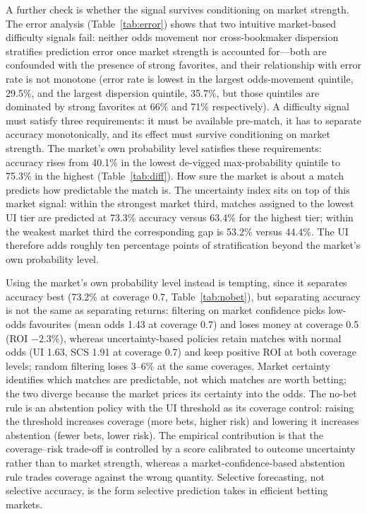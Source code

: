\documentclass[10pt]{article}
\begin{document}
A further check is whether the signal survives conditioning on market strength. The error analysis (Table~\ref{tab:error}) shows that two intuitive
market-based difficulty signals fail: neither odds movement nor cross-bookmaker
dispersion stratifies prediction error once market strength is accounted
for---both are confounded with the presence of strong favorites, and their
relationship with error rate is not monotone (error rate is lowest in the
largest odds-movement quintile, 29.5\%, and the largest dispersion quintile,
35.7\%, but those quintiles are dominated by strong favorites at 66\% and 71\%
respectively). A difficulty signal must satisfy three requirements: it must be
available pre-match, it has to separate accuracy monotonically, and its effect
must survive conditioning on market strength. The market's own probability
level satisfies these requirements: accuracy rises from 40.1\% in the lowest
de-vigged max-probability quintile to 75.3\% in the highest
(Table~\ref{tab:diff}). How sure the market is about a match predicts how
predictable the match is. The uncertainty index sits on top of this market
signal: within the strongest market third, matches assigned to the lowest UI
tier are predicted at 73.3\% accuracy versus 63.4\% for the highest tier;
within the weakest market third the corresponding gap is 53.2\% versus 44.4\%.
The UI therefore adds roughly ten percentage points of stratification beyond
the market's own probability level.

Using the market's own probability level instead is tempting, since it separates
accuracy best (73.2\% at coverage 0.7, Table~\ref{tab:nobet}), but separating
accuracy is not the same as separating returns: filtering on market confidence
picks low-odds favourites (mean odds 1.43 at coverage 0.7) and loses money at
coverage 0.5
(ROI $-2.3\%$), whereas uncertainty-based policies retain matches with normal
odds (UI 1.63, SCS 1.91 at coverage 0.7) and keep positive ROI at both coverage
levels; random filtering loses 3--6\% at the same coverages. Market certainty
identifies which matches are predictable, not which matches are worth betting;
the two diverge because the market prices its certainty into the odds. The
no-bet rule is an abstention policy with the UI threshold as its coverage
control: raising the threshold
increases coverage (more bets, higher risk) and lowering it increases abstention
(fewer bets, lower risk). The empirical contribution is that the coverage--risk
trade-off is controlled by a score calibrated to outcome uncertainty rather
than to market strength, whereas a market-confidence-based abstention rule
trades coverage against the wrong quantity. Selective forecasting, not
selective accuracy, is the form selective prediction takes in efficient betting
markets.
\end{document}
